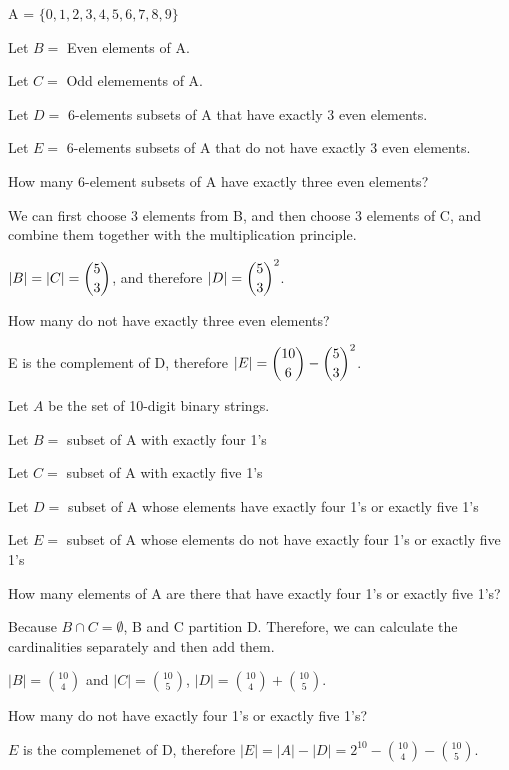 \documentclass[openany, 11pt]{book}
\begin{document}
\begin{exercise}{}{}
	A = $\{ 0,1,2,3,4,5,6,7,8,9\}$
	\begin{alist}
		\item Let $B=$ Even elements of A.
		\item Let $C=$ Odd elemements of A.
		\item Let $D=$ 6-elements subsets of A that have exactly 3 even elements.
		\item Let $E=$ 6-elements subsets of A that do not have exactly 3 even elements.
		\item How many 6-element subsets of A have exactly three even elements?
		\item We can first choose 3 elements from B, and then choose 3 elements
		of C, and combine them together with the multiplication principle.
		\item $|B| = |C| = \dbinom{5}{3}$, and therefore $|D| = {\dbinom{5}{3}}^2$.
		\item How many do not have exactly three even elements?
		\item E is the complement of D, therefore $|E| = \dbinom{10}{6} -
			{\dbinom{5}{3}}^2$.
	\end{alist}
\end{exercise}

\begin{exercise}{}{}
	Let $A$ be the set of 10-digit binary strings.
	\begin{alist}
		\item Let $B=$ subset of A with exactly four 1's
		\item Let $C=$ subset of A with exactly five 1's
		\item Let $D=$ subset of A whose elements have exactly four 1's or exactly five 1's
		\item Let $E=$ subset of A whose elements do not have exactly four 1's
		or exactly five 1's
		\item How many elements of A are there that have exactly four 1's or exactly five 1's?
		\item Because $B \cap C=\emptyset$, B and C partition D. Therefore, we can
		calculate the cardinalities separately and then add them.
		\item $|B|=\binom{10}{4}$ and $|C|=\binom{10}{5}$, $|D|= \binom{10}{4}+\binom{10}{5}$.
		\item How many do not have exactly four 1's or exactly five 1's?
		\item $E$ is the complemenet of D, therefore $|E| = |A| - |D| = 2^{10} -
			\binom{10}{4}-\binom{10}{5}$.
	\end{alist}
\end{exercise}
\end{document}
